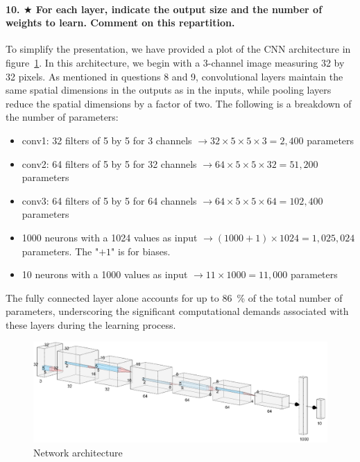 \documentclass{article}
\theoremstyle{plain}%
\theoremstyle{definition}
\theoremstyle{remark}
\begin{document}
\paragraph{10. $ \bigstar $ For each layer, indicate the output size and the number of weights to learn. Comment on this repartition.}
To simplify the presentation, we have provided a plot of the CNN architecture in figure~\ref{fig:AlexNetstylelog}. In this architecture, we begin with a 3-channel image measuring 32 by 32 pixels. As mentioned in questions 8 and 9, convolutional layers maintain the same spatial dimensions in the outputs as in the inputs, while pooling layers reduce the spatial dimensions by a factor of two. The following is a breakdown of the number of parameters:
\begin{itemize}
    \item conv1: 32 filters of 5 by 5 for 3 channels $\rightarrow 32\times 5\times 5\times 3 = 2,400$ parameters
    \item conv2: 64 filters of 5 by 5 for 32 channels $\rightarrow 64\times 5\times 5\times 32 = 51,200$ parameters
    \item conv3: 64 filters of 5 by 5 for 64 channels $\rightarrow 64\times 5\times 5\times 64 = 102,400$ parameters
    \item 1000 neurons with a 1024 values as input $\rightarrow (1000 + 1)\times 1024=1,025,024$ parameters. The "$+1$" is for biases.
    \item 10 neurons with a 1000 values as input $\rightarrow 11\times 1000=11,000$ parameters
\end{itemize}

The fully connected layer alone accounts for up to 86~\% of the total number of parameters, underscoring the significant computational demands associated with these layers during the learning process.

\begin{figure}[H]
    \centering
    \includegraphics*[width=\textwidth]{figs/AlexNet_style_log.png}
    \caption{Network architecture}
    \label{fig:AlexNetstylelog}
\end{figure}
\end{document}
